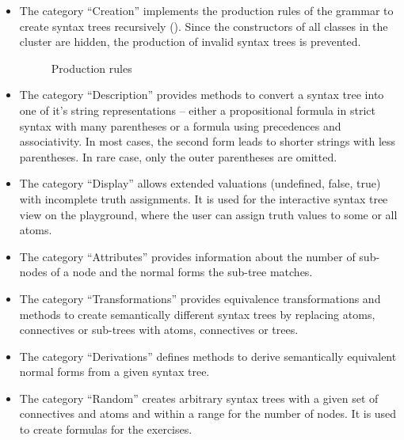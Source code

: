 \begin{itemize}

\item The category “Creation” implements the production rules of the grammar 
to create syntax trees recursively ().
Since the constructors of all classes in the cluster are hidden, 
the production of invalid syntax trees is prevented.

\begin{figure}[htbp]
\begin{center}
\caption{Production rules}
\label{fig:NyayaNodeCreation}
\end{center}
\end{figure}

\item The category “Description” provides methods to convert a syntax tree into one of it's string representations – 
either a propositional formula in strict syntax with many parentheses 
or a formula using precedences and associativity.
In most cases, the second form leads to shorter strings with less parentheses. 
In rare case, only the outer parentheses are omitted.

\item The category “Display”  allows extended valuations (undefined, false, true) 
with incomplete truth assignments. 
It is used for the interactive syntax tree view on the playground, 
where the user can assign truth values to some or all atoms.


\item The category “Attributes”  provides information about the number of sub-nodes of a node 
and the normal forms the sub-tree matches.

\item The category “Transformations” provides equivalence transformations 
and methods to create 
 semantically different syntax trees by replacing atoms, connectives or sub-trees with
atoms, connectives or trees.

\item The category “Derivations” defines methods to derive semantically equivalent normal forms from a given syntax tree.

\item The category “Random” creates arbitrary syntax trees with a given set of connectives and atoms and within a range for the number of nodes. It is used to create formulas for the exercises.


\end{itemize}
